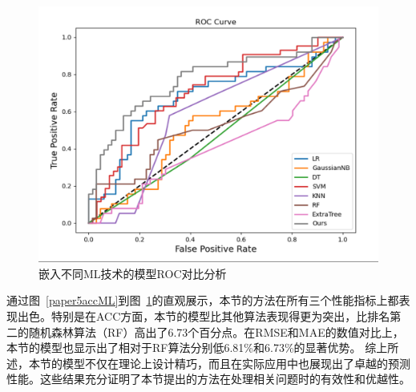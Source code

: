     \begin{figure}[ht]
      \centering
      \includegraphics[width=0.95\linewidth]{figs/paper5rocML.pdf}
      \caption{嵌入不同ML技术的模型ROC对比分析}\label{paper5rocML}
     \end{figure}

通过图~\ref{paper5accML}到图~\ref{paper5rocML}的直观展示，本节的方法在所有三个性能指标上都表现出色。特别是在ACC方面，本节的模型比其他算法表现得更为突出，比排名第二的随机森林算法（RF）高出了6.73个百分点。在RMSE和MAE的数值对比上，本节的模型也显示出了相对于RF算法分别低6.81\%和6.73\%的显著优势。
综上所述，本节的模型不仅在理论上设计精巧，而且在实际应用中也展现出了卓越的预测性能。这些结果充分证明了本节提出的方法在处理相关问题时的有效性和优越性。

